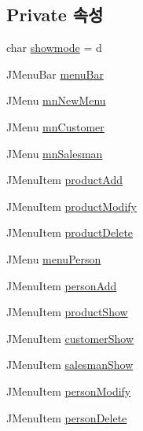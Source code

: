 \subsection*{Private 속성}
\begin{DoxyCompactItemize}
\item 
char \hyperlink{classpkg_1_1_management_u_i_a06db2befb99ab3b189caa39e736e2d0d}{showmode} = \textquotesingle{}d\textquotesingle{}
\item 
J\+Menu\+Bar \hyperlink{classpkg_1_1_management_u_i_ace9ff91bcebb641b7363e764eae00310}{menu\+Bar}
\item 
J\+Menu \hyperlink{classpkg_1_1_management_u_i_a02082701769fb188544b2211ebc5f759}{mn\+New\+Menu}
\item 
J\+Menu \hyperlink{classpkg_1_1_management_u_i_a0c7fb8ff1b3734316fe7bc49221a5814}{mn\+Customer}
\item 
J\+Menu \hyperlink{classpkg_1_1_management_u_i_a240bf0c46a930b09db9d727ce86c6ec7}{mn\+Salesman}
\item 
J\+Menu\+Item \hyperlink{classpkg_1_1_management_u_i_afafd026c860294aea147d42bad8ac11f}{product\+Add}
\item 
J\+Menu\+Item \hyperlink{classpkg_1_1_management_u_i_a2384d030e607b71538e1f809991b95be}{product\+Modify}
\item 
J\+Menu\+Item \hyperlink{classpkg_1_1_management_u_i_a035f7669304affd98f4304a8639ce4e8}{product\+Delete}
\item 
J\+Menu \hyperlink{classpkg_1_1_management_u_i_aac445016414136b78a968311480e8308}{menu\+Person}
\item 
J\+Menu\+Item \hyperlink{classpkg_1_1_management_u_i_a4781978da9cf1df76dde465ccdadc9f7}{person\+Add}
\item 
J\+Menu\+Item \hyperlink{classpkg_1_1_management_u_i_a46a473eb18422c9f6011fb4d773f65c5}{product\+Show}
\item 
J\+Menu\+Item \hyperlink{classpkg_1_1_management_u_i_ada892716bd590c607273c9a9b5353d03}{customer\+Show}
\item 
J\+Menu\+Item \hyperlink{classpkg_1_1_management_u_i_ad1d6b0d565e4379362dbb7f4071614a9}{salesman\+Show}
\item 
J\+Menu\+Item \hyperlink{classpkg_1_1_management_u_i_aadf201377400033cf5739556137eca44}{person\+Modify}
\item 
J\+Menu\+Item \hyperlink{classpkg_1_1_management_u_i_af5e74a22293246fcc049a6e21024e96f}{person\+Delete}
\end{DoxyCompactItemize}


